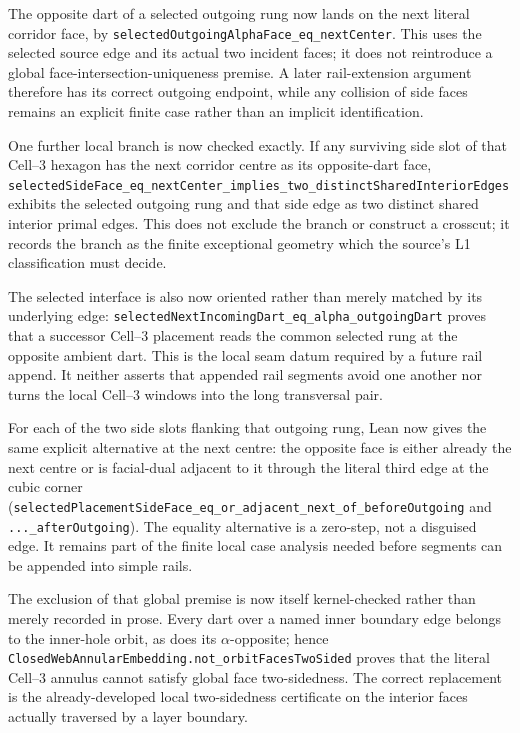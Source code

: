 \documentclass[11pt]{article}
\theoremstyle{definition}
\begin{document}
The opposite dart of a selected outgoing rung now lands on the next literal
corridor face, by
\texttt{selectedOutgoingAlphaFace\_eq\_nextCenter}.  This uses the selected
source edge and its actual two incident faces; it does not reintroduce a
global face-intersection-uniqueness premise.  A later rail-extension argument
therefore has its correct outgoing endpoint, while any collision of side
faces remains an explicit finite case rather than an implicit identification.

One further local branch is now checked exactly.  If any surviving side slot
of that Cell--3 hexagon has the next corridor centre as its opposite-dart
face, \texttt{selectedSideFace\_eq\_nextCenter\_implies\_two\_distinctSharedInteriorEdges}
exhibits the selected outgoing rung and that side edge as two distinct shared
interior primal edges.  This does not exclude the branch or construct a
crosscut; it records the branch as the finite exceptional geometry which the
source's L1 classification must decide.

The selected interface is also now oriented rather than merely matched by its
underlying edge: \texttt{selectedNextIncomingDart\_eq\_alpha\_outgoingDart}
proves that a successor Cell--3 placement reads the common selected rung at
the opposite ambient dart.  This is the local seam datum required by a future
rail append.  It neither asserts that appended rail segments avoid one
another nor turns the local Cell--3 windows into the long transversal pair.

For each of the two side slots flanking that outgoing rung, Lean now gives the
same explicit alternative at the next centre: the opposite face is either
already the next centre or is facial-dual adjacent to it through the literal
third edge at the cubic corner
(\texttt{selectedPlacementSideFace\_eq\_or\_adjacent\_next\_of\_beforeOutgoing}
and \texttt{...\_afterOutgoing}).  The equality alternative is a zero-step,
not a disguised edge.  It remains part of the finite local case analysis
needed before segments can be appended into simple rails.

The exclusion of that global premise is now itself kernel-checked rather than
merely recorded in prose.  Every dart over a named inner boundary edge belongs
to the inner-hole orbit, as does its $\alpha$-opposite; hence
\texttt{ClosedWebAnnularEmbedding.not\_orbitFacesTwoSided} proves that the
literal Cell--3 annulus cannot satisfy global face two-sidedness.  The correct
replacement is the already-developed local two-sidedness certificate on the
interior faces actually traversed by a layer boundary.
\end{document}
